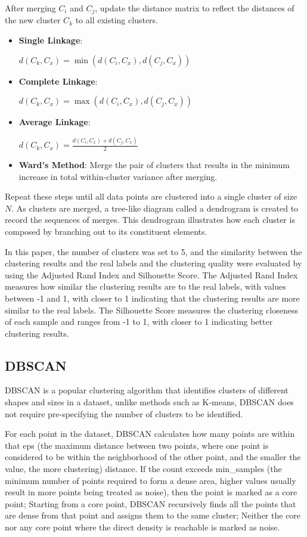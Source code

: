 \documentclass[conference]{IEEEtran}
\begin{document}
	After merging $C_i$ and $C_j$, update the distance matrix to reflect the distances of the new cluster $C_k$ to all existing clusters. 
	\begin{itemize}
		\item \textbf{Single Linkage}:
		
		 $d(C_k, C_x) = \min(d(C_i, C_x), d(C_j, C_x))$
		\item \textbf{Complete Linkage}: 
		
		$d(C_k, C_x) = \max(d(C_i, C_x), d(C_j, C_x))$
		\item \textbf{Average Linkage}: 
		
		$d(C_k, C_x) = \frac{d(C_i, C_x) + d(C_j, C_x)}{2}$
		\item \textbf{Ward's Method}: Merge the pair of clusters that results in the minimum increase in total within-cluster variance after merging.
	\end{itemize}
	
	Repeat these steps until all data points are clustered into a single cluster of size $N$. As clusters are merged, a tree-like diagram called a dendrogram is created to record the sequences of merges. This dendrogram illustrates how each cluster is composed by branching out to its constituent elements.
	
	In this paper, the number of clusters was set to 5, and the similarity between the clustering results and the real labels and the clustering quality were evaluated by using the Adjusted Rand Index and Silhouette Score. The Adjusted Rand Index measures how similar the clustering results are to the real labels, with values between -1 and 1, with closer to 1 indicating that the clustering results are more similar to the real labels. The Silhouette Score measures the clustering closeness of each sample and ranges from -1 to 1, with closer to 1 indicating better clustering results.
	
	\subsection{DBSCAN}\label{AA}
	DBSCAN is a popular clustering algorithm that identifies clusters of different shapes and sizes in a dataset, unlike methods such as K-means, DBSCAN does not require pre-specifying the number of clusters to be identified.
	
	For each point in the dataset, DBSCAN calculates how many points are within that eps (the maximum distance between two points, where one point is considered to be within the neighborhood of the other point, and the smaller the value, the more clustering) distance. If the count exceeds min\_samples (the minimum number of points required to form a dense area, higher values usually result in more points being treated as noise), then the point is marked as a core point; Starting from a core point, DBSCAN recursively finds all the points that are dense from that point and assigns them to the same cluster; Neither the core nor any core point where the direct density is reachable is marked as noise.
	
\end{document}

